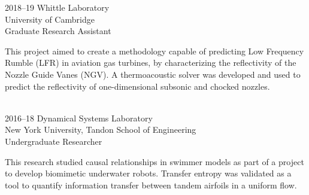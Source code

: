\documentclass[12pt,letterpaper]{report}
\newcommand{\listitemspace}{0.25em}
\renewenvironment{itemize}
{\begin{list}{}{\setlength{\leftmargin}{0em}
                \setlength{\parskip}{0em}
                \setlength{\itemsep}{\listitemspace}
                \setlength{\parsep}{\listitemspace}}}
{\end{list}}
\begin{document}
\begin{tablist}
        \item[2018--19] \tab{}Whittle Laboratory \\ 
        University of Cambridge \\ 
        Graduate Research Assistant \\

		
		\vspace{1.5mm}
		
		This project aimed to create a methodology capable of
predicting Low Frequency Rumble (LFR) in aviation gas turbines, by characterizing the reflectivity of the Nozzle Guide Vanes (NGV). A thermoacoustic solver was developed and used to predict the reflectivity of one-dimensional subsonic and chocked nozzles. \\\ 

        \item[2016--18] \tab{}Dynamical Systems Laboratory \\ 
        New York University, Tandon School of Engineering \\ 
        Undergraduate Researcher \\
        
  \vspace{1.5mm}
  
        This research studied causal relationships in swimmer models as part of a project to develop biomimetic underwater robots. Transfer entropy was validated as a tool to quantify  information transfer between tandem airfoils in a uniform flow. 

    \end{tablist}


%
%
%
\end{document}
